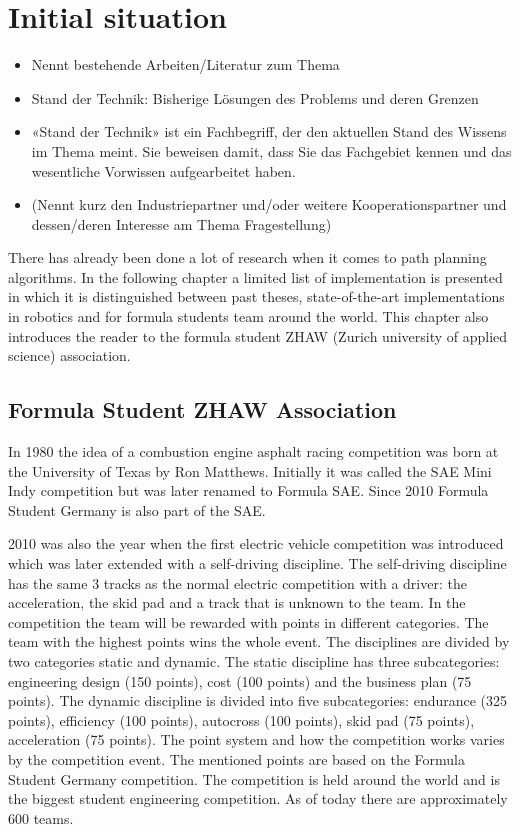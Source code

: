 \section{Initial situation}

\begin{itemize}
    \item Nennt bestehende Arbeiten/Literatur zum Thema
    \item Stand der Technik: Bisherige Lösungen des Problems und deren Grenzen
    \item «Stand der Technik» ist ein Fachbegriff, der den aktuellen Stand des Wissens im Thema meint. Sie beweisen damit, dass Sie das Fachgebiet kennen und das wesentliche Vorwissen aufgearbeitet haben.
    \item (Nennt kurz den Industriepartner und/oder weitere Kooperationspartner und dessen/deren Interesse am Thema Fragestellung)
\end{itemize}

There has already been done a lot of research when it comes to path planning algorithms. In the following chapter a limited list of implementation is presented in which it is distinguished between past theses, state-of-the-art implementations in robotics and for formula students team around the world. This chapter also introduces the reader to the formula student ZHAW (Zurich university of applied science) association.

\subsection{Formula Student ZHAW Association}
In 1980 the idea of a combustion engine asphalt racing competition was born at the University of Texas by Ron Matthews. Initially it was called the SAE Mini Indy competition but was later renamed to Formula SAE. Since 2010 Formula Student Germany is also part of the SAE.
\cite{formula_sae}

2010 was also the year when the first electric vehicle competition was introduced which was later extended with a self-driving discipline. The self-driving discipline has the same 3 tracks as the normal electric competition with a driver: the acceleration, the skid pad and a track that is unknown to the team. In the competition the team will be rewarded with points in different categories. The team with the highest points wins the whole event. The disciplines are divided by two categories static and dynamic. The static discipline has three subcategories: engineering design (150 points), cost (100 points) and the business plan (75 points). The dynamic discipline is divided into five subcategories: endurance (325 points), efficiency (100 points), autocross (100 points), skid pad (75 points), acceleration (75 points). The point system and how the competition works varies by the competition event. The mentioned points are based on the Formula Student Germany competition. The competition is held around the world and is the biggest student engineering competition. As of today there are approximately 600 teams.
\cite{amz_racing_history}

